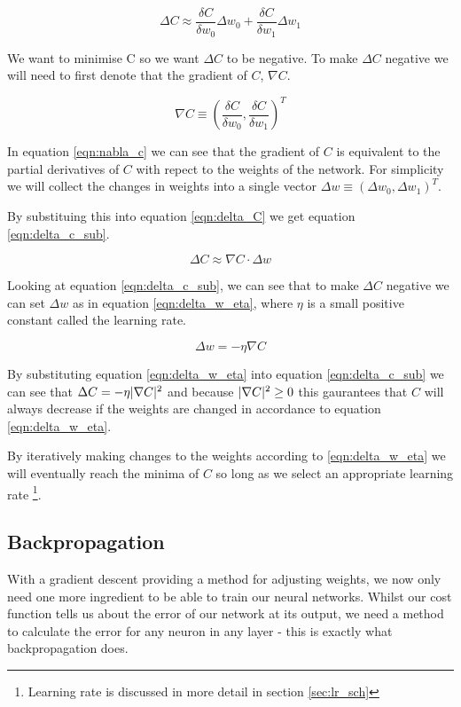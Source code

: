 \begin{equation}
\Delta C \approx \frac{\delta C}{\delta w_0} \Delta w_0 + \frac{\delta C}{\delta w_1} \Delta w_1
\label{eqn:delta_C}
\end{equation}

We want to minimise C so we want $\Delta C$ to be negative. To make $\Delta C$ negative we will need to first denote that the gradient of $C$, $\nabla C$. 

\begin{equation}
\nabla C \equiv (\frac{\delta C}{\delta w_0}, \frac{\delta C}{\delta w_1})^T
\label{eqn:nabla_c}
\end{equation}

In equation \ref{eqn:nabla_c} we can see that the gradient of $C$ is equivalent to the partial derivatives of $C$ with repect to the weights of the network. For simplicity we will collect the changes in weights into a single vector $\Delta w \equiv (\Delta w_0, \Delta w_1)^T$.

By substituing this into equation \ref{eqn:delta_C} we get equation \ref{eqn:delta_c_sub}.

\begin{equation}
\Delta C \approx \nabla C \cdot \Delta w 
\label{eqn:delta_c_sub}
\end{equation}

Looking at equation \ref{eqn:delta_c_sub}, we can see that to make $\Delta C$ negative we can set $\Delta w$ as in equation \ref{eqn:delta_w_eta}, where $\eta$ is a small positive constant called the learning rate.

\begin{equation}
\Delta w = -\eta \nabla C
\label{eqn:delta_w_eta}
\end{equation}

By substituting equation \ref{eqn:delta_w_eta} into equation \ref{eqn:delta_c_sub} we can see that $ \Delta C = - \eta \lvert\nabla C\rvert^2$ and because
 $\lvert\nabla C\rvert^2 \geq 0$ this gaurantees that $C$ will always decrease if the weights are changed in accordance to equation \ref{eqn:delta_w_eta}.

By iteratively making changes to the weights according to \ref{eqn:delta_w_eta} we will eventually reach the minima of $C$ so long as we select an appropriate learning rate \footnote{Learning rate is discussed in more detail in section \ref{sec:lr_sch}}. 

\subsection{Backpropagation}
With a gradient descent providing a method for adjusting  weights, we now only need one more ingredient to be able to train our neural networks. Whilst our cost function tells us about the error of our network at its output, we need a method to calculate the error for any neuron in any layer - this is exactly what backpropagation does.

